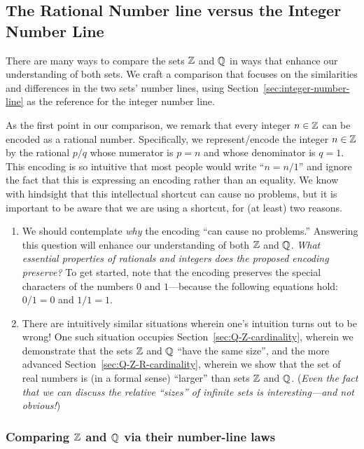 \subsection{The Rational Number line versus the Integer Number Line}
\label{sec:Compare-Q-Z}

There are many ways to compare the sets $\mathbb{Z}$ and $\mathbb{Q}$ in ways that
enhance our understanding of both sets.  We craft a comparison that
focuses on the similarities and differences in the two sets' number
lines, using Section~\ref{sec:integer-number-line} as the reference
for the integer number line.

As the first point in our comparison, we remark that every integer $n
\in \mathbb{Z}$ can be encoded as a rational 
number.  Specifically, we represent/encode the integer $n \in \mathbb{Z}$ by
the rational $p/q$ whose numerator is $p = n$ and whose denominator is
$q = 1$.  This encoding is so intuitive that most people would write
``$n = n/1$'' and ignore the fact that this is expressing an encoding
rather than an equality.  We know with hindsight that this
intellectual shortcut can cause no problems, but it is important to be
aware that we are using a shortcut, for (at least) two reasons.
\begin{enumerate}
\item
We should contemplate {\em why} the encoding ``can cause no
problems.''  Answering this question will enhance our understanding of
both $\mathbb{Z}$ and $\mathbb{Q}$.  {\em What essential properties of rationals and
  integers does the proposed encoding preserve?}  To get started, note
that the encoding preserves the special characters of the numbers $0$
and $1$---because the following equations hold: $0/1 = 0$ and $1/1 =
1$.

\item
There are intuitively similar situations wherein one's intuition turns
out to be wrong!  One such situation occupies
Section~\ref{sec:Q-Z-cardinality}, wherein we demonstrate that the
sets $\mathbb{Z}$ and $\mathbb{Q}$ ``have the same size'', and the more advanced
Section~\ref{sec:Q-Z-R-cardinality}, wherein we show that the set
of real numbers is (in a formal sense) ``larger'' than sets $\mathbb{Z}$ and
$\mathbb{Q}$.  ({\em Even the fact that we can discuss the relative ``sizes''
  of infinite sets is interesting---and not obvious!})
\end{enumerate}

\subsubsection{Comparing $\mathbb{Z}$ and $\mathbb{Q}$ via their number-line laws}
\label{sec:Q-Z-laws}

